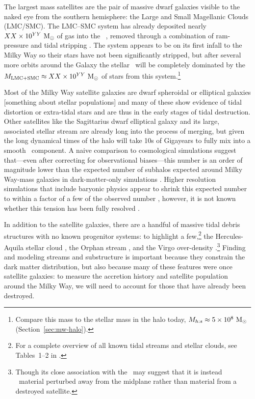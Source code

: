 The largest mass satellites are the pair of massive dwarf galaxies visible to the naked eye from the southern hemisphere: the Large and Small Magellanic Clouds (LMC/SMC). The LMC--SMC system has already deposited nearly $XX \times 10^{YY}~\mathrm{M}_\odot$ of gas into the \mwhalo\ \citep{putman-todo}, removed through a combination of ram-pressure and tidal stripping \citep{salem-todo}. The system appears to be on its first infall to the Milky Way \citep{besla10} so their stars have not been significantly stripped, but after several more orbits around the Galaxy the stellar \mwhalo\ will be completely dominated by the $M_{\rm LMC+SMC} \approx XX \times 10^{YY}~\mathrm{M}_\odot$ of stars from this system.\footnote{Compare this mass to the stellar mass in the halo today, $M_{h:s} \approx 5 \times 10^8~\mathrm{M}_\odot$ (Section~\ref{sec:mw-halo}).} 

Most of the Milky Way satellite galaxies are dwarf spheroidal or elliptical galaxies [something about stellar populations] and many of these show evidence of tidal distortion or extra-tidal stars \citep[e.g.,][]{todo-hercules, todo} and are thus in the early stages of tidal destruction. Other satellites like the Sagittarius dwarf elliptical galaxy and its large, associated stellar stream are already long into the process of merging, but given the long dynamical times of the halo will take 10s of Gigayears to fully mix into a smooth \mwhalo\ component. A naive comparison to cosmological simulations suggest that---even after correcting for observational biases---this number is an order of magnitude lower than the expected number of subhalos expected around Milky Way-mass galaxies in dark-matter-only simulations \citep[$\sim$1000;][]{missing-satellites-todo}. Higher resolution simulations that include baryonic physics appear to shrink this expected number to within a factor of a few of the observed number \citep{todo}, however, it is not known whether this tension has been fully resolved \citep{todo}.

In addition to the satellite galaxies, there are a handful of massive tidal debris structures with no known progenitor systems: to highlight a few,\footnote{For a complete overview of all known tidal streams and stellar clouds, see Tables~1--2 in \cite{grillmair16}.} the Hercules-Aquila stellar cloud \citep{todo}, the Orphan stream \citep{newberg02}, and the Virgo over-density \citep{todo}.\footnote{Though its close association with the \mwdisk\ may suggest that it is instead \mwdisk\ material perturbed away from the midplane rather than material from a destroyed satellite.} Finding and modeling streams and substructure is important because they constrain the dark matter distribution, but also because many of these features were once satellite galaxies: to measure the accretion history and satellite population around the Milky Way, we will need to account for those that have already been destroyed. 

